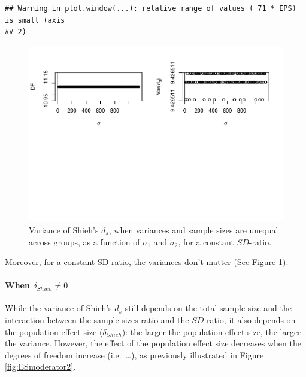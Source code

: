 \documentclass[
  man]{apa6}
\begin{document}
\begin{verbatim}
## Warning in plot.window(...): relative range of values ( 71 * EPS) is small (axis
## 2)
\end{verbatim}

\begin{figure}
\centering
\includegraphics{Theoretical-Variance-of-all-estimators-as-a-function-of-population-parameters_files/figure-latex/varshiehhetunbalvariance2-1.pdf}
\caption{\label{fig:varshiehhetunbalvariance2}Variance of Shieh's \(d_s\), when variances and sample sizes are unequal across groups, as a function of \(\sigma_1\) and \(\sigma_2\), for a constant \(SD\)-ratio.}
\end{figure}

Moreover, for a constant SD-ratio, the variances don't matter (See Figure \ref{fig:varshiehhetunbalvariance2}).

\hypertarget{when-delta_shieh-neq-0-2}{%
\paragraph{\texorpdfstring{When \(\delta_{Shieh} \neq 0\)}{When \textbackslash delta\_\{Shieh\} \textbackslash neq 0}}\label{when-delta_shieh-neq-0-2}}

While the variance of Shieh's \(d_s\) still depends on the total sample size and the interaction between the sample sizes ratio and the \(SD\)-ratio, it also depends on the population effect size (\(\delta_{Shieh}\)): the larger the population effect size, the larger the variance. However, the effect of the population effect size decreases when the degrees of freedom increase (i.e.~\ldots), as previously illustrated in Figure \ref{fig:ESmoderator2}.
\end{document}
